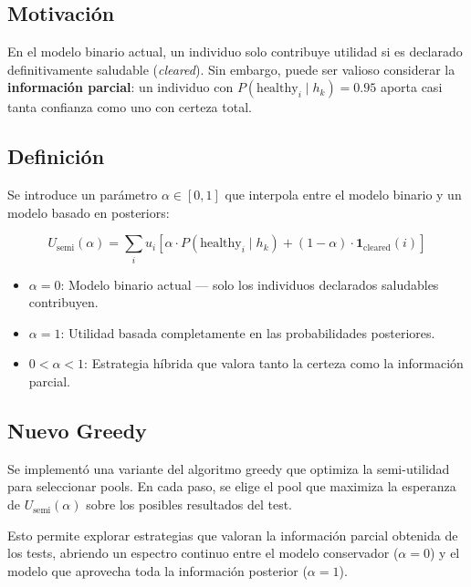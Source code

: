 \documentclass[11pt, a4paper]{article}
\begin{document}
\subsection{Motivaci\'on}
En el modelo binario actual, un individuo solo contribuye utilidad si es
declarado definitivamente saludable (\textit{cleared}). Sin embargo, puede
ser valioso considerar la \textbf{informaci\'on parcial}: un individuo con
$P(\text{healthy}_i \mid h_k) = 0.95$ aporta casi tanta confianza como uno
con certeza total.

\subsection{Definici\'on}
Se introduce un par\'ametro $\alpha \in [0, 1]$ que interpola entre el modelo
binario y un modelo basado en posteriors:

\begin{equation}
    U_{\text{semi}}(\alpha) = \sum_{i} u_i \left[
        \alpha \cdot P(\text{healthy}_i \mid h_k) +
        (1 - \alpha) \cdot \mathbf{1}_{\text{cleared}}(i)
    \right]
\end{equation}

\begin{itemize}[nosep]
    \item $\alpha = 0$: Modelo binario actual --- solo los individuos declarados
    saludables contribuyen.
    \item $\alpha = 1$: Utilidad basada completamente en las probabilidades
    posteriores.
    \item $0 < \alpha < 1$: Estrategia h\'ibrida que valora tanto la certeza
    como la informaci\'on parcial.
\end{itemize}

\subsection{Nuevo Greedy}
Se implement\'o una variante del algoritmo greedy que optimiza la semi-utilidad
para seleccionar pools. En cada paso, se elige el pool que maximiza la
esperanza de $U_{\text{semi}}(\alpha)$ sobre los posibles resultados del test.

Esto permite explorar estrategias que valoran la informaci\'on parcial obtenida
de los tests, abriendo un espectro continuo entre el modelo conservador
($\alpha = 0$) y el modelo que aprovecha toda la informaci\'on posterior
($\alpha = 1$).

\end{document}
